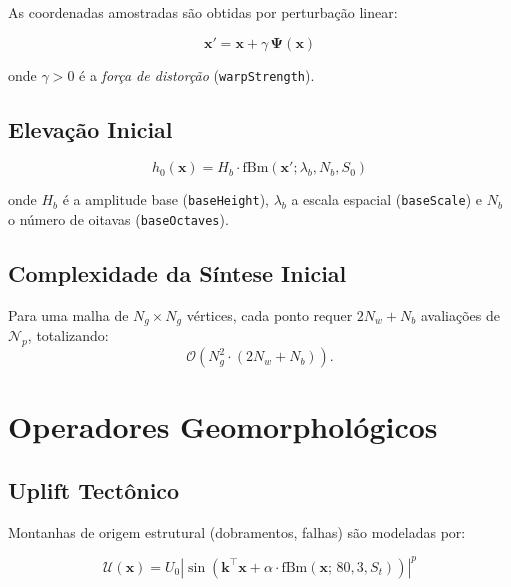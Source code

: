 \documentclass[11pt,a4paper]{article}
\begin{document}
As coordenadas amostradas são obtidas por perturbação linear:

\begin{equation}
  \mathbf{x}' = \mathbf{x} + \gamma \,\boldsymbol{\Psi}(\mathbf{x})
  \label{eq:warp}
\end{equation}

onde $\gamma > 0$ é a \emph{força de distorção} (\texttt{warpStrength}).

\subsection{Elevação Inicial}

\begin{equation}
  h_0(\mathbf{x}) = H_b \cdot \text{fBm}(\mathbf{x}'; \lambda_b, N_b, S_0)
  \label{eq:h0}
\end{equation}

onde $H_b$ é a amplitude base (\texttt{baseHeight}), $\lambda_b$ a escala espacial
(\texttt{baseScale}) e $N_b$ o número de oitavas (\texttt{baseOctaves}).

\subsection{Complexidade da Síntese Inicial}

Para uma malha de $N_g \times N_g$ vértices, cada ponto requer $2 N_w + N_b$ avaliações de
$\mathcal{N}_p$, totalizando:
\begin{equation}
  \mathcal{O}\!\left(N_g^2 \cdot (2N_w + N_b)\right).
\end{equation}

\section{Operadores Geomorphológicos}

\subsection{Uplift Tectônico}

Montanhas de origem estrutural (dobramentos, falhas) são modeladas por:

\begin{equation}
  \mathcal{U}(\mathbf{x}) = U_0 \left|\sin\!\left(\mathbf{k}^\top\mathbf{x}
  + \alpha \cdot \text{fBm}(\mathbf{x};\, 80, 3, S_t)\right)\right|^p
  \label{eq:tectonic}
\end{equation}
\end{document}
